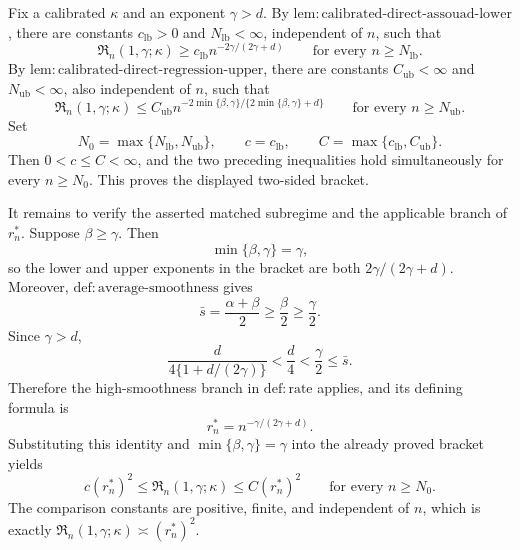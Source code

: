 Fix a calibrated \(\kappa\) and an exponent \(\gamma>d\). By \(\mathrm{lem:calibrated\text{-}direct\text{-}assouad\text{-}lower}\), there are constants \(c_{\mathrm{lb}}>0\) and \(N_{\mathrm{lb}}<\infty\), independent of \(n\), such that
\[
\mathfrak R_n(1,\gamma;\kappa)\ge c_{\mathrm{lb}}n^{-2\gamma/(2\gamma+d)}
\qquad\text{for every }n\ge N_{\mathrm{lb}}.
\]
By \(\mathrm{lem:calibrated\text{-}direct\text{-}regression\text{-}upper}\), there are constants \(C_{\mathrm{ub}}<\infty\) and \(N_{\mathrm{ub}}<\infty\), also independent of \(n\), such that
\[
\mathfrak R_n(1,\gamma;\kappa)
\le C_{\mathrm{ub}}n^{-2\min\{\beta,\gamma\}/\{2\min\{\beta,\gamma\}+d\}}
\qquad\text{for every }n\ge N_{\mathrm{ub}}.
\]
Set
\[
N_0=\max\{N_{\mathrm{lb}},N_{\mathrm{ub}}\},
\qquad c=c_{\mathrm{lb}},
\qquad C=\max\{c_{\mathrm{lb}},C_{\mathrm{ub}}\}.
\]
Then \(0<c\le C<\infty\), and the two preceding inequalities hold simultaneously for every \(n\ge N_0\). This proves the displayed two-sided bracket.

It remains to verify the asserted matched subregime and the applicable branch of \(r_n^*\). Suppose \(\beta\ge\gamma\). Then
\[
\min\{\beta,\gamma\}=\gamma,
\]
so the lower and upper exponents in the bracket are both \(2\gamma/(2\gamma+d)\). Moreover, \(\mathrm{def:average\text{-}smoothness}\) gives
\[
\bar s=\frac{\alpha+\beta}{2}\ge\frac{\beta}{2}\ge\frac{\gamma}{2}.
\]
Since \(\gamma>d\),
\[
\frac{d}{4\{1+d/(2\gamma)\}}
<\frac d4
<\frac\gamma2
\le\bar s.
\]
Therefore the high-smoothness branch in \(\mathrm{def:rate}\) applies, and its defining formula is
\[
r_n^*=n^{-\gamma/(2\gamma+d)}.
\]
Substituting this identity and \(\min\{\beta,\gamma\}=\gamma\) into the already proved bracket yields
\[
c(r_n^*)^2
\le\mathfrak R_n(1,\gamma;\kappa)
\le C(r_n^*)^2
\qquad\text{for every }n\ge N_0.
\]
The comparison constants are positive, finite, and independent of \(n\), which is exactly \(\mathfrak R_n(1,\gamma;\kappa)\asymp(r_n^*)^2\).
